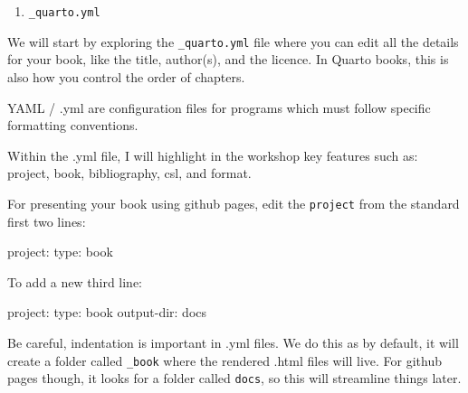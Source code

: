 \documentclass[
  letterpaper,
  DIV=11,
  numbers=noendperiod]{scrreprt}
\newenvironment{Shaded}{\begin{snugshade}}{\end{snugshade}}
\newcommand{\NormalTok}[1]{\textcolor[rgb]{0.00,0.23,0.31}{#1}}
\newcommand{\SpecialCharTok}[1]{\textcolor[rgb]{0.37,0.37,0.37}{#1}}
\providecommand{\tightlist}{%
  \setlength{\itemsep}{0pt}\setlength{\parskip}{0pt}}\usepackage{longtable,booktabs,array}
\begin{document}
\begin{enumerate}
\def\labelenumi{\arabic{enumi}.}
\tightlist
\item
  \texttt{\_quarto.yml}
\end{enumerate}

We will start by exploring the \texttt{\_quarto.yml} file where you can
edit all the details for your book, like the title, author(s), and the
licence. In Quarto books, this is also how you control the order of
chapters.

\begin{tcolorbox}[enhanced jigsaw, colbacktitle=quarto-callout-note-color!10!white, titlerule=0mm, leftrule=.75mm, title=\textcolor{quarto-callout-note-color}{\faInfo}\hspace{0.5em}{What is a .yml file?}, breakable, bottomrule=.15mm, opacitybacktitle=0.6, rightrule=.15mm, opacityback=0, arc=.35mm, colframe=quarto-callout-note-color-frame, toptitle=1mm, bottomtitle=1mm, toprule=.15mm, left=2mm, colback=white, coltitle=black]

YAML / .yml are configuration files for programs which must follow
specific formatting conventions.

\end{tcolorbox}

Within the .yml file, I will highlight in the workshop key features such
as: project, book, bibliography, csl, and format.

For presenting your book using github pages, edit the \texttt{project}
from the standard first two lines:

\begin{Shaded}
\begin{Highlighting}[]
\NormalTok{project}\SpecialCharTok{:}
\NormalTok{  type}\SpecialCharTok{:}\NormalTok{ book}
\end{Highlighting}
\end{Shaded}

To add a new third line:

\begin{Shaded}
\begin{Highlighting}[]
\NormalTok{project}\SpecialCharTok{:}
\NormalTok{  type}\SpecialCharTok{:}\NormalTok{ book}
\NormalTok{  output}\SpecialCharTok{{-}}\NormalTok{dir}\SpecialCharTok{:}\NormalTok{ docs}
\end{Highlighting}
\end{Shaded}

Be careful, indentation is important in .yml files. We do this as by
default, it will create a folder called \texttt{\_book} where the
rendered .html files will live. For github pages though, it looks for a
folder called \texttt{docs}, so this will streamline things later.
\end{document}
